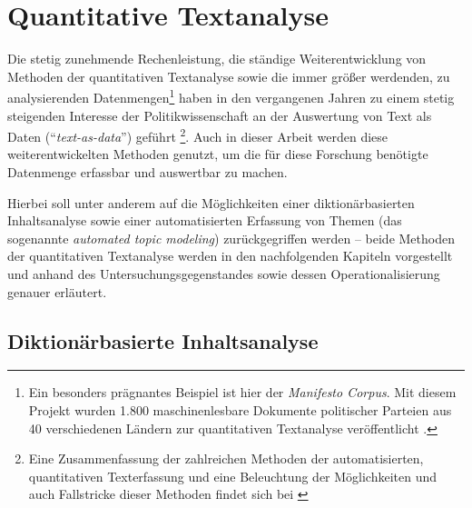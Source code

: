 \documentclass[12pt, 
    twoside=false, 
    bibliography=totoc, 
    numbers=endperiod, 
    headings=normal, 
    toc=chapterentrydotfill
    ]{scrbook}
\begin{document}
\section{Quantitative Textanalyse}

Die stetig zunehmende Rechenleistung, die ständige Weiterentwicklung von Methoden der quantitativen Textanalyse sowie die immer größer werdenden, zu analysierenden Datenmengen\footnote{Ein besonders prägnantes Beispiel ist hier der \emph{Manifesto Corpus}. Mit diesem Projekt wurden 1.800 maschinenlesbare Dokumente politischer Parteien aus 40 verschiedenen Ländern zur quantitativen Textanalyse veröffentlicht \parencite{merz_2016}.} haben in den vergangenen Jahren zu einem stetig steigenden Interesse der Politikwissenschaft an der Auswertung von Text als Daten (\enquote{\emph{text-as-data}}) geführt \parencite[vgl.][]{wilkerson_2017}\footnote{Eine Zusammenfassung der zahlreichen Methoden der automatisierten, quantitativen Texterfassung und eine Beleuchtung der Möglichkeiten und auch Fallstricke dieser Methoden findet sich bei \textcite{grimmer_2013}}. 
Auch in dieser Arbeit werden diese weiterentwickelten Methoden genutzt, um die für diese Forschung benötigte Datenmenge erfassbar und auswertbar zu machen.

Hierbei soll unter anderem auf die Möglichkeiten einer diktionärbasierten Inhaltsanalyse sowie einer automatisierten Erfassung von Themen (das sogenannte \emph{automated topic modeling}) zurückgegriffen werden -- beide Methoden der quantitativen Textanalyse werden in den nachfolgenden Kapiteln vorgestellt und anhand des Untersuchungsgegenstandes sowie dessen Operationalisierung genauer erläutert.


\subsection{Diktionärbasierte Inhaltsanalyse}\label{kapitel:diktionär}
\end{document}
